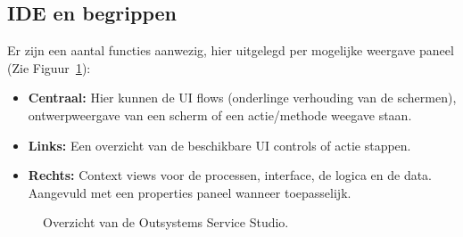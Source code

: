 \subsection{IDE en begrippen}
Er zijn een aantal functies aanwezig, hier uitgelegd per mogelijke weergave paneel (Zie Figuur~\ref{fig:ide-overzicht}):
\begin{itemize}
    \item \textbf{Centraal:} Hier kunnen de UI flows (onderlinge verhouding van de schermen), ontwerpweergave van een scherm of een actie/methode weegave staan.
    \item \textbf{Links:} Een overzicht van de beschikbare UI controls of actie stappen.
    \item \textbf{Rechts:} Context views voor de processen, interface, de logica en de data. Aangevuld met een properties paneel wanneer toepasselijk.
\end{itemize}

\begin{figure}[h!]
     \caption{Overzicht van de Outsystems Service Studio.}
     \label{fig:ide-overzicht}
\end{figure}

